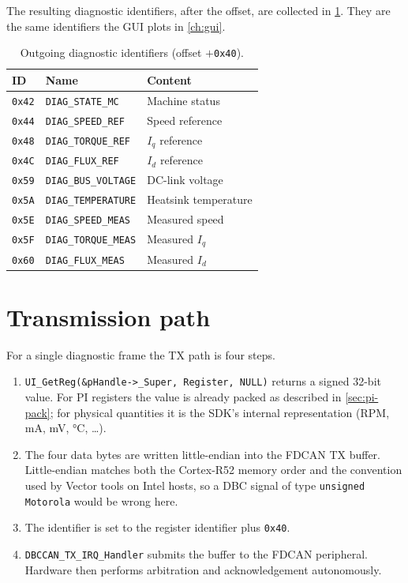 The resulting diagnostic identifiers, after the offset, are collected in
\cref{tab:diag-map}. They are the same identifiers the GUI plots in
\cref{ch:gui}.

\begin{table}[ht]
\centering
\caption{Outgoing diagnostic identifiers (offset $+$\texttt{0x40}).}
\label{tab:diag-map}
\begin{tabular}{lll}
\toprule
ID & Name & Content \\
\midrule
\texttt{0x42} & \texttt{DIAG\_STATE\_MC}     & Machine status \\
\texttt{0x44} & \texttt{DIAG\_SPEED\_REF}    & Speed reference \\
\texttt{0x48} & \texttt{DIAG\_TORQUE\_REF}   & $I_q$ reference \\
\texttt{0x4C} & \texttt{DIAG\_FLUX\_REF}     & $I_d$ reference \\
\texttt{0x59} & \texttt{DIAG\_BUS\_VOLTAGE}  & DC-link voltage \\
\texttt{0x5A} & \texttt{DIAG\_TEMPERATURE}   & Heatsink temperature \\
\texttt{0x5E} & \texttt{DIAG\_SPEED\_MEAS}   & Measured speed \\
\texttt{0x5F} & \texttt{DIAG\_TORQUE\_MEAS}  & Measured $I_q$ \\
\texttt{0x60} & \texttt{DIAG\_FLUX\_MEAS}    & Measured $I_d$ \\
\bottomrule
\end{tabular}
\end{table}

\section{Transmission path}
\label{sec:tx}

For a single diagnostic frame the TX path is four steps.

\begin{enumerate}[leftmargin=1.6em]
  \item \texttt{UI\_GetReg(\&pHandle->\_Super, Register, NULL)} returns a
        signed 32-bit value. For PI registers the value is already packed
        as described in \cref{sec:pi-pack}; for physical quantities it is
        the SDK's internal representation (RPM, \si{\milli\ampere},
        \si{\milli\volt}, \si{\celsius}, \ldots).
  \item The four data bytes are written little-endian into the FDCAN TX
        buffer. Little-endian matches both the Cortex-R52 memory order and
        the convention used by Vector tools on Intel hosts, so a DBC signal
        of type \texttt{unsigned Motorola} would be wrong here.
  \item The identifier is set to the register identifier plus
        \texttt{0x40}.
  \item \texttt{DBCCAN\_TX\_IRQ\_Handler} submits the buffer to the FDCAN
        peripheral. Hardware then performs arbitration and acknowledgement
        autonomously.
\end{enumerate}

